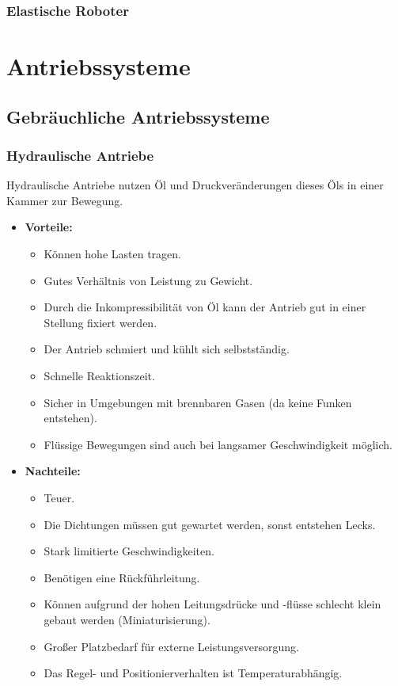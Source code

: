 \documentclass[a4paper, 11pt, accentcolor = tud3b]{tudreport}
\begin{document}
			\subsection{Elastische Roboter} %

	\chapter{Antriebssysteme}
		\section{Gebräuchliche Antriebssysteme}
			\subsection{Hydraulische Antriebe}
				Hydraulische Antriebe nutzen Öl und Druckveränderungen dieses Öls in einer Kammer zur Bewegung.
				
				\begin{itemize}
					\item \textbf{Vorteile:}
						\begin{itemize}
							\item Können hohe Lasten tragen.
							\item Gutes Verhältnis von Leistung zu Gewicht.
							\item Durch die Inkompressibilität von Öl kann der Antrieb gut in einer Stellung fixiert werden.
							\item Der Antrieb schmiert und kühlt sich selbstständig.
							\item Schnelle Reaktionszeit.
							\item Sicher in Umgebungen mit brennbaren Gasen (da keine Funken entstehen).
							\item Flüssige Bewegungen sind auch bei langsamer Geschwindigkeit möglich.
						\end{itemize}
					\item \textbf{Nachteile:}
						\begin{itemize}
							\item Teuer.
							\item Die Dichtungen müssen gut gewartet werden, sonst entstehen Lecks.
							\item Stark limitierte Geschwindigkeiten.
							\item Benötigen eine Rückführleitung.
							\item Können aufgrund der hohen Leitungsdrücke und -flüsse schlecht klein gebaut werden (Miniaturisierung).
							\item Großer Platzbedarf für externe Leistungsversorgung.
							\item Das Regel- und Positionierverhalten ist Temperaturabhängig.
						\end{itemize}
				\end{itemize}
			
\end{document}
